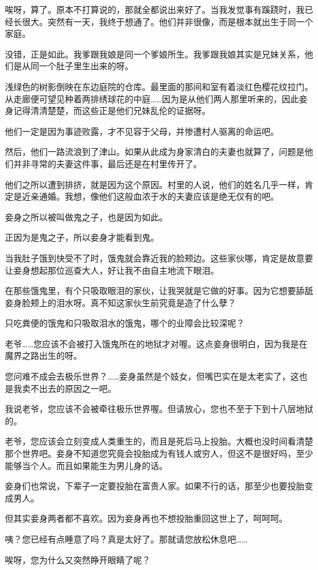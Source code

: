 \documentclass[portrait,a4paper]{article}
\begin{document}
唉呀，算了。原本不打算说的，那就全都说出来好了。当我发觉事有蹊跷时，我已经长很大。突然有一天，我终于想通了。他们并非很像，而是根本就出生于同一个家庭。

没错，正是如此。我爹跟我娘是同一个爹娘所生。我爹跟我娘其实是兄妹关系，他们是从同一个肚子里生出来的呀。

浅绿色的树影倒映在东边庭院的仓库。最里面的那间和室有着淡红色樱花纹拉门。从走廊便可望见种着两排绣球花的中庭……因为是从他们两人那里听来的，因此妾身记得清清楚楚，而这些正是他们兄妹乱伦的证据呀。

他们一定是因为事迹败露，才不见容于父母，并惨遭村人驱离的命运吧。

然后，他们一路流浪到了津山。如果从此成为身家清白的夫妻也就算了，问题是他们并非寻常的夫妻这件事，最后还是在村里传开了。

他们之所以遭到排挤，就是因为这个原因。村里的人说，他们的姓名几乎一样，肯定是近亲通婚。我想，像他们这般血浓于水的夫妻应该是绝无仅有的吧。

妾身之所以被叫做鬼之子，也是因为如此。

正因为是鬼之子，所以妾身才能看到鬼。

当我肚子饿到快受不了时，饿鬼就会靠近我的脸颊边。这些家伙哪，肯定是故意要让妾身想起那位巡查大人，好让我不由自主地流下眼泪。

在那些饿鬼里，有个只吸取眼泪的家伙，让我哭就是它做的好事。因为它想要舔舐妾身脸颊上的泪水呀。真不知这家伙生前究竟是造了什么孽？

只吃粪便的饿鬼和只吸取泪水的饿鬼，哪个的业障会比较深呢？

老爷……您应该不会被打入饿鬼所在的地狱才对喔。这点妾身很明白，因为我是在魔界之路出生的呀。

您问难不成会去极乐世界？……妾身虽然是个妓女，但嘴巴实在是太老实了，这也是我卖不出去的原因之一吧。

我说老爷，您应该不会被牵往极乐世界喔。但请放心，您也不至于下到十八层地狱的。

老爷，您应该会立刻变成人类重生的，而且是死后马上投胎。大概也没时间看清楚那个世界吧。妾身不知道您究竟会投胎成为有钱人或穷人，但这不是很好吗，至少能够当个人。而且如果能生为男儿身的话。

妾身们也常说，下辈子一定要投胎在富贵人家。如果不行的话，那至少也要投胎变成男人。

但其实妾身两者都不喜欢。因为妾身再也不想投胎重回这世上了，呵呵呵。

咦？您已经有点睡意了吗？真是太好了。那就请您放松休息吧……

唉呀，您为什么又突然睁开眼睛了呢？
\end{document}
